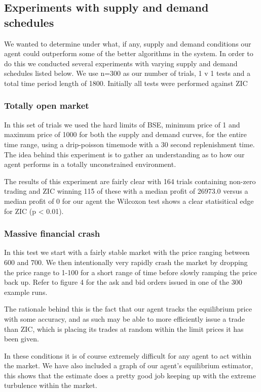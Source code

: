 \documentclass{acm_proc_article-sp}
\begin{document}
\subsection{Experiments with supply and demand schedules}

We wanted to determine under what, if any, supply and demand conditions our
agent could outperform some of the better algorithms in the system. In order to
do this we conducted several experiments with varying supply and demand
schedules listed below. We use n=300 as our number of trials, 1 v 1 tests and a
total time period length of 1800. Initially all tests were performed against
ZIC

\subsubsection{Totally open market}

In this set of trials we used the hard limits of BSE, minimum price of 1 and
maximum price of 1000 for both the supply and demand curves, for the entire
time range, using a drip-poisson timemode with a 30 second replenishment time.
The idea behind this experiment is to gather an understanding as to how our
agent performs in a totally unconstrained environment.

The results of this experiment are fairly clear with 164 trials containing
non-zero trading and ZIC winning 115 of these with a median profit of 26973.0
versus a median profit of 0 for our agent the Wilcoxon test shows a clear
statisitical edge for ZIC (p < 0.01).

\subsubsection{Massive financial crash}

In this test we start with a fairly stable market with the price ranging
between 600 and 700. We then intentionally very rapidly crash the market by
dropping the price range to 1-100 for a short range of time before slowly
ramping the price back up.  Refer to figure 4 for the ask and bid orders
issued in one of the 300 example runs.

The rationale behind this is the fact that our agent tracks the equilibrium price
with some accuracy, and as such may be able to more efficiently issue a trade
than ZIC, which is placing its trades at random within the limit prices it has
been given.

In these conditions it is of course extremely difficult for any agent to act
within the market. We have also included a graph of our agent's equilibrium
estimator, this shows that the estimate does a pretty good job keeping up with
the extreme turbulence within the market.
\end{document}
